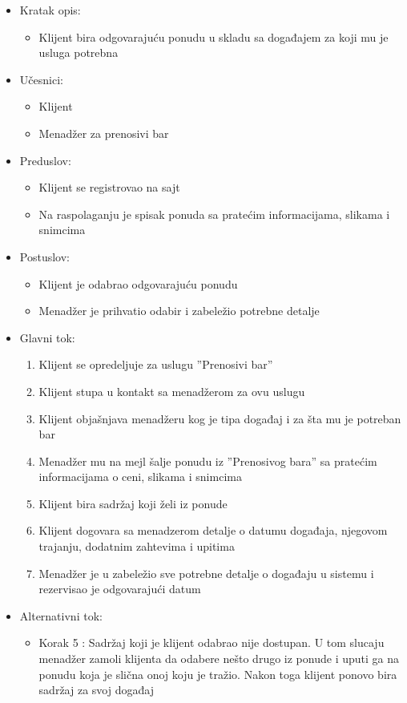\documentclass[a4paper]{article}
\begin{document}
\begin{itemize}
    \item Kratak opis:
        \begin{itemize}
            \item Klijent bira odgovarajuću ponudu u skladu sa događajem za koji mu je usluga potrebna
        \end{itemize}
    \item Učesnici:
        \begin{itemize}
            \item Klijent
            \item Menadžer za prenosivi bar
        \end{itemize}
    \item Preduslov:
        \begin{itemize}
            \item Klijent se registrovao na sajt
		    \item Na raspolaganju je spisak ponuda sa pratećim informacijama, slikama i snimcima
        \end{itemize}
    \item Postuslov:
        \begin{itemize}
            \item Klijent je odabrao odgovarajuću ponudu
            \item Menadžer je prihvatio odabir i zabeležio potrebne detalje
        \end{itemize}
    \item Glavni tok:
        \begin{enumerate}
		    \item Klijent se opredeljuje za uslugu ''Prenosivi bar''
		    \item Klijent stupa u kontakt sa menadžerom za ovu uslugu
		    \item Klijent objašnjava menadžeru kog je tipa događaj i za šta mu je potreban bar
		    \item Menadžer mu na mejl šalje ponudu iz ''Prenosivog bara'' sa pratećim informacijama o ceni, slikama i snimcima
		    \item Klijent bira sadržaj koji želi iz ponude
		    \item Klijent dogovara sa menadzerom detalje o datumu događaja, njegovom trajanju, dodatnim zahtevima i upitima
		    \item Menadžer je u zabeležio sve potrebne detalje o događaju u sistemu i rezervisao je odgovarajući datum
        \end{enumerate}
    \item Alternativni tok:
        \begin{itemize}
            \item Korak 5 : Sadržaj koji je klijent odabrao nije dostupan. U tom slucaju menadžer zamoli klijenta da odabere nešto drugo iz ponude i uputi ga na ponudu koja je slična onoj koju je tražio. Nakon toga klijent ponovo bira sadržaj za svoj događaj
        \end{itemize}
\end{itemize}
\end{document}
